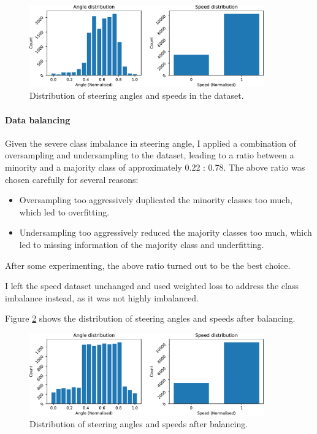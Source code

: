 \documentclass{article}
\begin{document}
\begin{figure}[h]
  \centering
  \includegraphics[width=0.9\textwidth]{figures/angle_speed_distribution.pdf}
  \caption{Distribution of steering angles and speeds in the dataset.}
  \label{fig:angle_speed_distribution}
\end{figure}

\paragraph{Data balancing}
Given the severe class imbalance in steering angle, I applied a combination of oversampling and undersampling to the dataset, leading to a ratio between a minority and a majority class of approximately 0.22 : 0.78. The above ratio was chosen carefully for several reasons:
\begin{itemize}
  \item Oversampling too aggressively duplicated the minority classes too much, which led to overfitting.
  \item Undersampling too aggressively reduced the majority classes too much, which led to missing information of the majority class and underfitting.
\end{itemize}
After some experimenting, the above ratio turned out to be the best choice.

I left the speed dataset unchanged and used weighted loss to address the class imbalance instead, as it was not highly imbalanced.

Figure \ref{fig:angle_speed_distribution_balanced} shows the distribution of steering angles and speeds after balancing.

\begin{figure}[h]
  \centering
  \includegraphics[width=0.9\textwidth]{figures/angle_speed_distribution_balanced.pdf}
  \caption{Distribution of steering angles and speeds after balancing.}
  \label{fig:angle_speed_distribution_balanced}
\end{figure}
\end{document}
